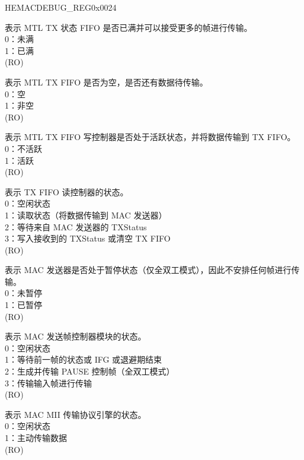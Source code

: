 \begin{register}{H}{EMACDEBUG\_REG}{0x0024}\label{regdesc:EMACDEBUGREG}
%
%
%
%
%
%
%
%
%
%
%
%
%
%
%
%
%
\regnewline%
\begin{regdesc}\begin{reglist}
\item [MTLTSFFS] 表示 MTL TX 状态 FIFO 是否已满并可以接受更多的帧进行传输。\\
0：未满\\
1：已满\\ (RO)
\item [MTLTFNES] 表示 MTL TX FIFO 是否为空，是否还有数据待传输。\\
0：空\\
1：非空\\(RO)
\item [MTLTFWCS] 表示 MTL TX FIFO 写控制器是否处于活跃状态，并将数据传输到 TX FIFO。\\
0：不活跃\\
1：活跃\\(RO)
\item [MTLTFRCS] 表示 TX FIFO 读控制器的状态。\\
0：空闲状态\\
1：读取状态（将数据传输到 MAC 发送器）\\
2：等待来自 MAC 发送器的 TXStatus\\
3：写入接收到的 TXStatus 或清空 TX FIFO\\
(RO)
\item [MACTP] 表示 MAC 发送器是否处于暂停状态（仅全双工模式），因此不安排任何帧进行传输。\\
0：未暂停\\
1：已暂停\\
(RO)
\item [MACTFCS] 表示 MAC 发送帧控制器模块的状态。\\
0：空闲状态\\
1：等待前一帧的状态或 IFG 或退避期结束\\
2：生成并传输 PAUSE 控制帧（全双工模式）\\
3：传输输入帧进行传输\\
(RO)
\item [MACTPES] 表示 MAC MII 传输协议引擎的状态。\\
0：空闲状态\\
1：主动传输数据\\(RO)

\item[见下页...]
\end{reglist}\end{regdesc}
\end{register}
